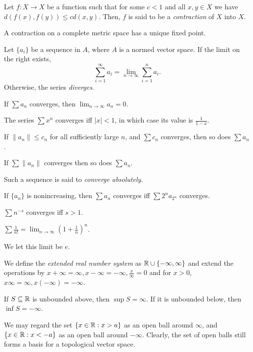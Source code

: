 \begin{defn}
    Let $f:X\to X$ be a function such that for some $c<1$ and all $x,y\in X$ we
    have $d(f(x),f(y))\le cd(x,y)$. Then, $f$ is said to be a \emph{contraction}
    of $X$ into $X$.
\end{defn}
\begin{prop}
    A contraction on a complete metric space has a unique fixed point.
\end{prop}
\begin{defn}
    Let $\{a_i\}$ be a sequence in $A$, where $A$ is a normed vector space.
    If the limit on the right exists,
    \[\sum_{i=1}^\infty a_i=\lim_{n\to\infty}\sum_{i=1}^n a_i.\]
    Otherwise, the series \emph{diverges}.
\end{defn}
\begin{prop}
    If $\sum a_n$ converges, then $\lim_{n\to\infty} a_n=0$.
\end{prop}
\begin{prop}
    The series $\sum x^n$ converges iff $|x|<1$, in which case its value is
    $\frac{1}{1-x}$.
\end{prop}
\begin{prop}
    If $\|a_n\|\le c_n$ for all sufficiently large $n$, and $\sum c_n$ converges,
    then so does $\sum a_n$.
\end{prop}
\begin{cor}
    If $\sum\|a_n\|$ converges then so does $\sum a_n$.
\end{cor}
\begin{defn}
    Such a sequence is said to \emph{converge absolutely}.
\end{defn}
\begin{prop}
    If $\{a_n\}$ is nonincreasing, then $\sum a_n$ converges iff $\sum 2^n
    a_{2^n}$ converges.
\end{prop}
\begin{cor}
    $\sum n^{-s}$ converges iff $s>1$.
\end{cor}
\begin{prop}
    $\sum\frac 1{n!}=\lim_{n\to\infty}\left(1+\frac 1n\right)^n$.
\end{prop}
\begin{defn}
    We let this limit be $e$.
\end{defn}
\begin{defn}
    We define the \emph{extended real number system} as
    $\mathbb{R}\cup\{-\infty,\infty\}$ and extend the operations by
    $x+\infty=\infty,x-\infty=-\infty,\frac x{\infty}=0$
    and for $x>0$, $x\infty=\infty,x(-\infty)=-\infty$.

    If $S\subseteq\mathbb{R}$ is unbounded above, then $\sup S=\infty$. If it is
    unbounded below, then $\inf S=-\infty$.

    We may regard the set $\{x\in\mathbb{R}:x>a\}$ as an open ball around $\infty$, and
    $\{x\in\mathbb{R}:x<-a\}$ as an open ball around $-\infty$. Clearly, the set of
    open balls still forms a basis for a topological vector space.
\end{defn}
